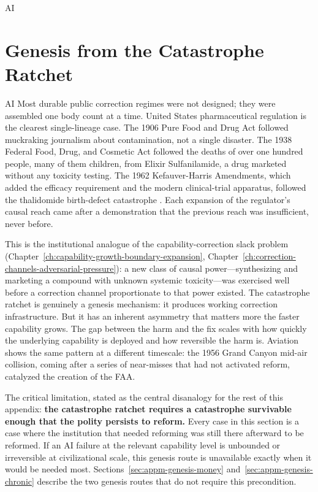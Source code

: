 \begin{refsection}
\begin{authbar}{AI}
\end{authbar}
\authbarneedspace
\section{Genesis from the Catastrophe Ratchet}
\label{sec:appm-genesis-catastrophe}
\begin{authbar}{AI}
Most durable public correction regimes were not designed; they were assembled one body count at a time.
United States pharmaceutical regulation is the clearest single-lineage case.
The 1906 Pure Food and Drug Act followed muckraking journalism about contamination, not a single disaster.
The 1938 Federal Food, Drug, and Cosmetic Act followed the deaths of over one hundred people, many of them children, from Elixir Sulfanilamide, a drug marketed without any toxicity testing.
The 1962 Kefauver-Harris Amendments, which added the efficacy requirement and the modern clinical-trial apparatus, followed the thalidomide birth-defect catastrophe \autocite{carpenter2010reputation}.
Each expansion of the regulator's causal reach came after a demonstration that the previous reach was insufficient, never before.

This is the institutional analogue of the capability-correction slack problem (Chapter~\ref{ch:capability-growth-boundary-expansion}, Chapter~\ref{ch:correction-channels-adversarial-pressure}): a new class of causal power---synthesizing and marketing a compound with unknown systemic toxicity---was exercised well before a correction channel proportionate to that power existed.
The catastrophe ratchet is genuinely a genesis mechanism: it produces working correction infrastructure.
But it has an inherent asymmetry that matters more the faster capability grows.
The gap between the harm and the fix scales with how quickly the underlying capability is deployed and how reversible the harm is.
Aviation shows the same pattern at a different timescale: the 1956 Grand Canyon mid-air collision, coming after a series of near-misses that had not activated reform, catalyzed the creation of the FAA.

The critical limitation, stated as the central disanalogy for the rest of this appendix: \textbf{the catastrophe ratchet requires a catastrophe survivable enough that the polity persists to reform.} Every case in this section is a case where the institution that needed reforming was still there afterward to be reformed. If an AI failure at the relevant capability level is unbounded or irreversible at civilizational scale, this genesis route is unavailable exactly when it would be needed most. Sections~\ref{sec:appm-genesis-money} and~\ref{sec:appm-genesis-chronic} describe the two genesis routes that do not require this precondition.


\end{authbar}
\end{refsection}
